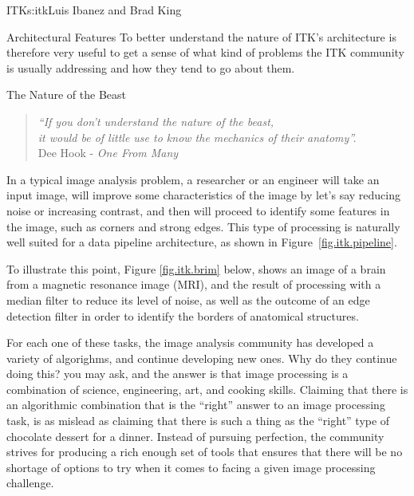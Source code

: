 \begin{aosachapter}{ITK}{s:itk}{Luis Ibanez and Brad King}
\begin{aosasect1}{Architectural Features}
To better understand the nature of ITK's architecture is therefore very useful
to get a sense of what kind of problems the ITK community is usually addressing
and how they tend to go about them.

\begin{aosasect2}{The Nature of the Beast}

\begin{center}
\begin{quotation}
\emph{
``If you don't understand the nature of the beast,\\
it would be of little use to know the mechanics of their anatomy''.\\
}
\hfill Dee Hook - \emph{One From Many}
\end{quotation}
\end{center}

In a typical image analysis problem, a researcher or an engineer will take an
input image, will improve some characteristics of the image by let's say
reducing noise or increasing contrast, and then will proceed to identify some
features in the image, such as corners and strong edges. This type of
processing is naturally well suited for a data pipeline architecture, as
shown in Figure~\ref{fig.itk.pipeline}.

To illustrate this point, Figure \ref{fig.itk.brim} below, shows an image of a
brain from a magnetic resonance image (MRI), and the result of processing with
a median filter to reduce its level of noise, as well as the outcome of an edge
detection filter in order to identify the borders of anatomical structures.


%
%

For each one of these tasks, the image analysis community has developed a
variety of algorighms, and continue developing new ones. Why do they continue
doing this? you may ask, and the answer is that image processing is a
combination of science, engineering, art, and cooking skills. Claiming that
there is an algorithmic combination that is the ``right'' answer to an image
processing task, is as mislead as claiming that there is such a thing as the
``right'' type of chocolate dessert for a dinner. Instead of pursuing
perfection, the community strives for producing a rich enough set of tools that
ensures that there will be no shortage of options to try when it comes to
facing a given image processing challenge.


\end{aosasect2}
\end{aosasect1}
\end{aosachapter}
